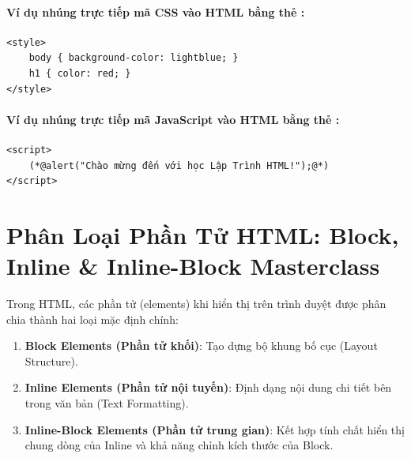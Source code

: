 \paragraph{Ví dụ nhúng trực tiếp mã CSS vào HTML bằng thẻ :}
\begin{codeWindow}
\begin{lstlisting}[language=HTML5]
<style>
    body { background-color: lightblue; }
    h1 { color: red; }
</style>
\end{lstlisting}
\end{codeWindow}

\paragraph{Ví dụ nhúng trực tiếp mã JavaScript vào HTML bằng thẻ :}
\begin{codeWindow}
\begin{lstlisting}[language=HTML5]
<script>
    (*@alert("Chào mừng đến với học Lập Trình HTML!");@*)
</script>
\end{lstlisting}
\end{codeWindow}

\section{Phân Loại Phần Tử HTML: Block, Inline \& Inline-Block Masterclass}
\label{sec:html_block_inline_masterclass}

Trong HTML, các phần tử (elements) khi hiển thị trên trình duyệt được phân chia thành hai loại mặc định chính:
\begin{enumerate}[leftmargin=1.8em, itemsep=3pt, parsep=0pt]
    \item \textbf{Block Elements (Phần tử khối)}: Tạo dựng bộ khung bố cục (Layout Structure).
    \item \textbf{Inline Elements (Phần tử nội tuyến)}: Định dạng nội dung chi tiết bên trong văn bản (Text Formatting).
    \item \textbf{Inline-Block Elements (Phần tử trung gian)}: Kết hợp tính chất hiển thị chung dòng của Inline và khả năng chỉnh kích thước của Block.
\end{enumerate}

